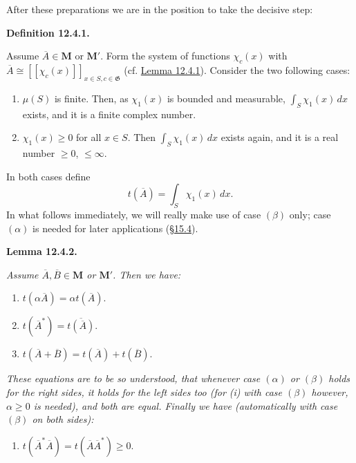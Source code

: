 \documentclass[12pt,b5paper,twoside]{article}
\newcommand{\M}{\mathbf M}
\newcommand{\Definition}[1]{%
  \par\smallskip\noindent\phantomsection\label{def:#1}\textbf{Definition #1.}\enspace
}
\newcommand{\Lemma}[1]{%
  \par\smallskip\noindent\phantomsection\label{lem:#1}\textbf{Lemma #1.}\enspace
}
\newcommand{\secref}[1]{\hyperref[sec:#1]{\S#1}}
\newcommand{\lemref}[1]{\hyperref[lem:#1]{Lemma #1}}
\begin{document}
After these preparations we are in the position to take the decisive step:

\Definition{12.4.1}
Assume $\overline A\in\M$ or $\M'$. Form the system of functions $\chi_c(x)$
with $\overline A\cong[[\chi_c(x)]]_{x\in S,c\in\mathfrak G}$
(cf. \lemref{12.4.1}). Consider the two following cases:
\begin{enumerate}[leftmargin=2.4em]
\item[$(\alpha)$] $\mu(S)$ is finite. Then, as $\chi_1(x)$ is bounded and measurable,
  $\int_S\chi_1(x)\,dx$ exists, and it is a finite complex number.
\item[$(\beta)$] $\chi_1(x)\geq0$ for all $x\in S$. Then
  $\int_S\chi_1(x)\,dx$ exists again, and it is a real number $\geq0$,
  $\leq\infty$.
\end{enumerate}
In both cases define
\[
 t(\overline A)=\int_S\chi_1(x)\,dx.
\]
In what follows immediately, we will really make use of case $(\beta)$ only;
case $(\alpha)$ is needed for later applications (\secref{15.4}).

\Lemma{12.4.2}
\emph{Assume $\overline A,\overline B\in\M$ or $\M'$. Then we have:}
\begin{enumerate}[label=(\roman*)]
\item $t(\alpha\overline A)=\alpha t(\overline A)$.
\item $t(\overline A^*)=\overline{t(\overline A)}$.
\item $t(\overline A+\overline B)=t(\overline A)+t(\overline B)$.
\end{enumerate}
\emph{These equations are to be so understood, that whenever case
$(\alpha)$ or $(\beta)$
holds for the right sides, it holds for the left sides too (for (i) with case
$(\beta)$ however, $\alpha\geq0$ is needed), and both are equal. Finally we
have (automatically with case $(\beta)$ on both sides):}
\begin{enumerate}[label=(\roman*),start=4]
\item $t(\overline A^*\overline A)
  =t(\overline A\overline A^*)\geq0$.
\end{enumerate}
\end{document}
